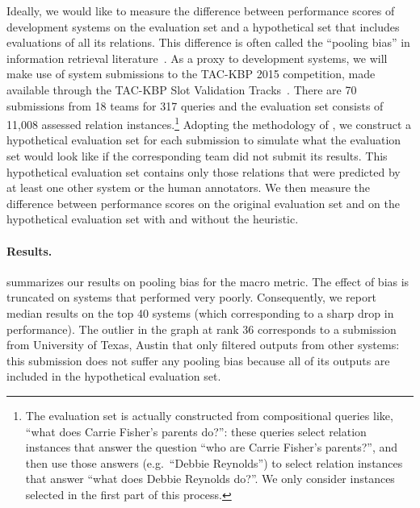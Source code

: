 Ideally, we would like to measure the difference between performance scores of development systems on the evaluation set and a hypothetical set that includes evaluations of all its relations.
This difference is often called the ``pooling bias'' in information retrieval literature~\citep{}. %
As a proxy to development systems, we will make use of system submissions to the TAC-KBP 2015 competition, made available through the TAC-KBP Slot Validation Tracks~\citep{}.
There are 70 submissions from 18 teams for 317 queries and the evaluation set consists of 11,008 assessed relation instances.\footnote{%
  The evaluation set is actually constructed from compositional queries like, ``what does Carrie Fisher's parents do?'':
  these queries select relation instances that answer the question ``who are Carrie Fisher's parents?'', and then use those answers (e.g.\ ``Debbie Reynolds'') to select relation instances that answer ``what does Debbie Reynolds do?''.
  We only consider instances selected in the first part of this process.
}
Adopting the methodology of \citet{weber2010measurement},
we construct a hypothetical evaluation set for each submission to simulate what the evaluation set would look like if the corresponding team did not submit its results.
This hypothetical evaluation set contains only those relations that were predicted by at least one other system or the human annotators.
We then measure the difference between performance scores on the original evaluation set and on the hypothetical evaluation set with and without the \anydoc heuristic. 

\paragraph{Results.}
 summarizes our results on pooling bias for the macro \fone{} metric.
The effect of bias is truncated on systems that performed very poorly.
Consequently, we report median results on the top 40 systems (which corresponding to a sharp drop in performance).
The outlier in the graph at rank 36 corresponds to a submission from University of Texas, Austin that only filtered outputs from other systems: this submission does not suffer any pooling bias because all of its outputs are included in the hypothetical evaluation set.

